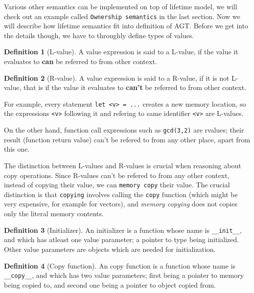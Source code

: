 \documentclass[times, utf8, diplomski]{fer}
\theoremstyle{definition}
\newtheorem{definition}{Definition}[]
\begin{document}
Various other semantics can be implemented on top of lifetime model, we will check out an example called
\texttt{Ownership semantics} in the last section. Now we will describe how lifetime semantics fit into
definition of AGT. Before we get into the details though, we have to throughly define types of values.

\begin{definition}[L-value]
A value expression is said to a L-value, 
if the value it evaluates to \textbf{can} be referred to from other context.
\end{definition}

\begin{definition}[R-value]
A value expression is said to a R-value, if it is not L-value, that is
if the value it evaluates to \textbf{can't} be referred to from other context.
\end{definition}

For example, every statement \texttt{let <v> = ...} creates a new memory location,
so the expressions \texttt{<v>} following it and refering to same identifier \texttt{<v>} are L-values.

On the other hand, function call expressions such as \texttt{gcd(3,2)} are rvalues; their result
(function return value) can't be refered to from any other place, apart from this one.

The distinction between L-values and R-values is crucial when reasoning about copy operations.
Since R-values can't be refered to from any other context, instead of copying their value, 
we can \texttt{memory copy} their value. The crucial distinction is that \texttt{copying}
involves calling the \texttt{copy} function (which might be very expensive, for example for vectors),
and \textit{memory copying} does not copies only the literal memory contents.

\begin{definition}[Initializer]
An initializer is a function whose name is \texttt{\_\_init\_\_}, and which has atleast one value parameter;
a pointer to type being initialized. Other value parameters are objects which are needed for initialization.
\end{definition}

\begin{definition}[Copy function]
An copy function is a function whose name is \texttt{\_\_copy\_\_}, and which has two value parameters;
first being a pointer to memory being copied to, and second one being a pointer to object copied from.
\end{definition}
\end{document}
